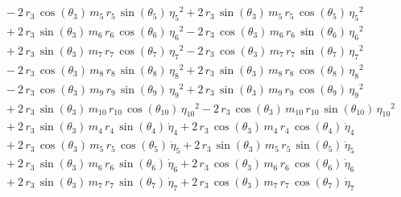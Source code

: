 \begin{eqnarray*}
 \\ &&\quad\mbox{} - 2\,r_{3}\,\cos({\theta_{3}})\,m_{5}\,r_{5}\,\sin(
{\theta_{5}})\,{{\eta_{5}}}^2 + 2\,r_{3}\,\sin({\theta_{3}})\,m_{5}\,r
_{5}\,\cos({\theta_{5}})\,{{\eta_{5}}}^2 \\ &&\quad\mbox{} + 2\,r_{3}
\,\sin({\theta_{3}})\,m_{6}\,r_{6}\,\cos({\theta_{6}})\,{{\eta_{6}}}^2
 - 2\,r_{3}\,\cos({\theta_{3}})\,m_{6}\,r_{6}\,\sin({\theta_{6}})\,{{
\eta_{6}}}^2 \\ &&\quad\mbox{} + 2\,r_{3}\,\sin({\theta_{3}})\,m_{7}\,
r_{7}\,\cos({\theta_{7}})\,{{\eta_{7}}}^2 - 2\,r_{3}\,\cos({\theta_{3}
})\,m_{7}\,r_{7}\,\sin({\theta_{7}})\,{{\eta_{7}}}^2 \\ &&\quad\mbox{}
 - 2\,r_{3}\,\cos({\theta_{3}})\,m_{8}\,r_{8}\,\sin({\theta_{8}})\,{{
\eta_{8}}}^2 + 2\,r_{3}\,\sin({\theta_{3}})\,m_{8}\,r_{8}\,\cos({
\theta_{8}})\,{{\eta_{8}}}^2 \\ &&\quad\mbox{} - 2\,r_{3}\,\cos({
\theta_{3}})\,m_{9}\,r_{9}\,\sin({\theta_{9}})\,{{\eta_{9}}}^2 + 2\,r
_{3}\,\sin({\theta_{3}})\,m_{9}\,r_{9}\,\cos({\theta_{9}})\,{{\eta_{9}
}}^2 \\ &&\quad\mbox{} + 2\,r_{3}\,\sin({\theta_{3}})\,m_{10}\,r_{10}
\,\cos({\theta_{10}})\,{{\eta_{10}}}^2 - 2\,r_{3}\,\cos({\theta_{3}})
\,m_{10}\,r_{10}\,\sin({\theta_{10}})\,{{\eta_{10}}}^2
 \\ &&\quad\mbox{} + 2\,r_{3}\,\sin({\theta_{3}})\,m_{4}\,r_{4}\,\sin(
{\theta_{4}})\,{\dot{\eta}_{4}} + 2\,r_{3}\,\cos({\theta_{3}})\,m_{4}
\,r_{4}\,\cos({\theta_{4}})\,{\dot{\eta}_{4}} \\ &&\quad\mbox{} + 2\,r
_{3}\,\cos({\theta_{3}})\,m_{5}\,r_{5}\,\cos({\theta_{5}})\,{
\dot{\eta}_{5}} + 2\,r_{3}\,\sin({\theta_{3}})\,m_{5}\,r_{5}\,\sin({
\theta_{5}})\,{\dot{\eta}_{5}} \\ &&\quad\mbox{} + 2\,r_{3}\,\sin({
\theta_{3}})\,m_{6}\,r_{6}\,\sin({\theta_{6}})\,{\dot{\eta}_{6}} + 2\,
r_{3}\,\cos({\theta_{3}})\,m_{6}\,r_{6}\,\cos({\theta_{6}})\,{
\dot{\eta}_{6}} \\ &&\quad\mbox{} + 2\,r_{3}\,\sin({\theta_{3}})\,m_{7
}\,r_{7}\,\sin({\theta_{7}})\,{\dot{\eta}_{7}} + 2\,r_{3}\,\cos({
\theta_{3}})\,m_{7}\,r_{7}\,\cos({\theta_{7}})\,{\dot{\eta}_{7}}
 \end{eqnarray*}
